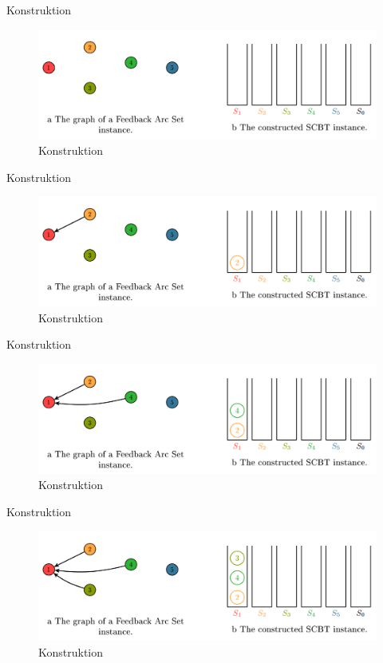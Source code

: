 \documentclass{beamer}
\begin{document}
\begin{frame}{Konstruktion}
\begin{figure}[ht]
		\includegraphics[width=\textwidth]{construct10}
		\caption{Konstruktion}
    \end{figure}
\end{frame}

\begin{frame}{Konstruktion}
\begin{figure}[ht]
		\includegraphics[width=\textwidth]{construct09}
		\caption{Konstruktion}
    \end{figure}
\end{frame}

\begin{frame}{Konstruktion}
\begin{figure}[ht]
		\includegraphics[width=\textwidth]{construct08}
		\caption{Konstruktion}
    \end{figure}
\end{frame}

\begin{frame}{Konstruktion}
\begin{figure}[ht]
		\includegraphics[width=\textwidth]{construct07}
		\caption{Konstruktion}
    \end{figure}
\end{frame}
\end{document}
